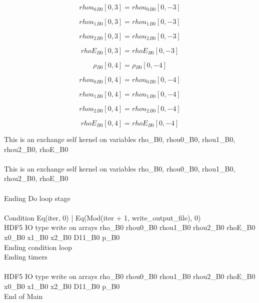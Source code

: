 \documentclass{article}
\begin{document}
\begin{dmath}{rhou_{0}{_{B0}}}[{0,3}] = {rhou_{0}{_{B0}}}[{0,-3}]\end{dmath}

\begin{dmath}{rhou_{1}{_{B0}}}[{0,3}] = {rhou_{1}{_{B0}}}[{0,-3}]\end{dmath}

\begin{dmath}{rhou_{2}{_{B0}}}[{0,3}] = {rhou_{2}{_{B0}}}[{0,-3}]\end{dmath}

\begin{dmath}{rhoE{_{B0}}}[{0,3}] = {rhoE{_{B0}}}[{0,-3}]\end{dmath}

\begin{dmath}{\rho{_{B0}}}[{0,4}] = {\rho{_{B0}}}[{0,-4}]\end{dmath}

\begin{dmath}{rhou_{0}{_{B0}}}[{0,4}] = {rhou_{0}{_{B0}}}[{0,-4}]\end{dmath}

\begin{dmath}{rhou_{1}{_{B0}}}[{0,4}] = {rhou_{1}{_{B0}}}[{0,-4}]\end{dmath}

\begin{dmath}{rhou_{2}{_{B0}}}[{0,4}] = {rhou_{2}{_{B0}}}[{0,-4}]\end{dmath}

\begin{dmath}{rhoE{_{B0}}}[{0,4}] = {rhoE{_{B0}}}[{0,-4}]\end{dmath}

\noindent This is an exchange self kernel on variables rho_B0, rhou0_B0, rhou1_B0, rhou2_B0, rhoE_B0\\\\\noindent This is an exchange self kernel on variables rho_B0, rhou0_B0, rhou1_B0, rhou2_B0, rhoE_B0\\\\\noindent Ending Do loop stage\\
\\\noindent Condition Eq(iter, 0) | Eq(Mod(iter + 1, write_output_file), 0)\\\noindent HDF5 IO type write on arrays rho_B0 rhou0_B0 rhou1_B0 rhou2_B0 rhoE_B0 x0_B0 x1_B0 x2_B0 D11_B0 p_B0\\\noindent Ending condition loop %
\\\noindent Ending timers\\
\\\noindent HDF5 IO type write on arrays rho_B0 rhou0_B0 rhou1_B0 rhou2_B0 rhoE_B0 x0_B0 x1_B0 x2_B0 D11_B0 p_B0\\\noindent End of Main\\
\end{document}
